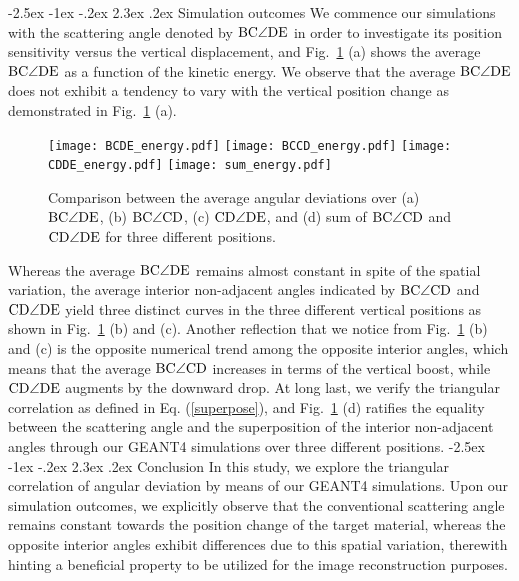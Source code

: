 \documentclass[10.75pt]{article}
\makeatletter
\renewcommand\section{\@startsection{section}{1}{\z@}%
   {-2.5ex \@plus -1ex \@minus -.2ex}%
   {2.3ex \@plus.2ex}%
   {\normalfont\large\bfseries}}
\makeatother
\begin{document}
\section{Simulation outcomes}
We commence our simulations with the scattering angle denoted by $\rm  BC\angle DE$ in order to investigate its position sensitivity versus the vertical displacement, and Fig.~\ref{results} (a) shows the average $\rm  BC\angle DE$ as a function of the kinetic energy. We observe that the average $\rm  BC\angle DE$ does not exhibit a tendency to vary with the vertical position change as demonstrated in Fig.~\ref{results} (a). 
\label{simulation outcomes}
\begin{figure}[H]
\begin{center}
\texttt{[image: BCDE\_energy.pdf]}
\hskip 0.3cm
\texttt{[image: BCCD\_energy.pdf]}
\hskip 0.3cm
\texttt{[image: CDDE\_energy.pdf]}
\hskip 0.3cm
\texttt{[image: sum\_energy.pdf]}
\caption{Comparison between the average angular deviations over (a) $\rm  BC\angle DE$, (b) $\rm  BC\angle CD$, (c) $\rm  CD\angle DE$, and (d) sum of $\rm  BC\angle CD$ and $\rm  CD\angle DE$ for three different positions.}
\label{results}
\end{center}
\end{figure}
Whereas the average $\rm BC\angle DE$ remains almost constant in spite of the spatial variation, the average interior non-adjacent angles indicated by $\rm  BC\angle CD$ and $\rm  CD\angle DE$ yield three distinct curves in the three different vertical positions as shown in Fig.~\ref{results} (b) and (c). Another reflection that we notice from Fig.~\ref{results} (b) and (c) is the opposite numerical trend among the opposite interior angles, which means that the average $\rm  BC\angle CD$ increases in terms of the vertical boost, while $\rm  CD\angle DE$ augments by the downward drop. At long last, we verify the triangular correlation as defined in Eq. (\ref{superpose}), and Fig.~\ref{results} (d) ratifies the equality between the scattering angle and the superposition of the interior non-adjacent angles through our GEANT4 simulations over three different positions.
\section{Conclusion}
In this study, we explore the triangular correlation of angular deviation by means of our GEANT4 simulations. Upon our simulation outcomes, we explicitly observe that the conventional scattering angle remains constant towards the position change of the target material, whereas the opposite interior angles exhibit differences due to this spatial variation, therewith hinting a beneficial property to be utilized for the image reconstruction purposes.
\label{conclusion}

%

\end{document}
